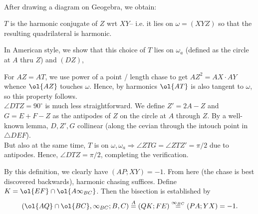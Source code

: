 \documentclass{seto}
\begin{document}
\\[4pt]
After drawing a diagram on Geogebra, we obtain:
\begin{block}[Characterization of T]
$T$ is the harmonic conjugate of $Z$ wrt $XY$-- i.e. it lies on $\omega=(XYZ)$ so that the resulting quadrilateral is harmonic.
\end{block}
In American style, we show that this choice of $T$ lies on $\omega_a$ (defined as the circle at $A$ thru $Z$) and $(DZ)$, 
\begin{block}
For $AZ=AT$, we use power of a point / length chase to get $AZ^2=AX\cdot AY$
whence $\ol{AZ}$ touches $\omega$. Hence, by harmonics $\ol{AT}$ is
also tangent to $\omega$, so this property follows. \\[4pt]
$\angle DTZ=90^\circ$ is much less straightforward.
We define $Z'=2A-Z$ and $G=E+F-Z$ as the antipodes of $Z$ on the circle at $A$
through $Z$. By a well-known lemma, $D,Z',G$ collinear (along the cevian through
the intouch point in $\triangle DEF$).
\\[4pt]
But also at the same time, $T$ is on $\omega,\omega_a\Rightarrow \angle
ZTG=\angle ZTZ'=\pi/2$ due to antipodes. Hence, $\angle DTZ=\pi/2$, completing
the verification.
\end{block}
By this definition, we clearly have $(AP;XY)=-1$. 
From here (the chase is best discovered backwards), harmonic chasing suffices. Define $K=\ol{EF}\cap\ol{A\infty_{BC}}$. 
Then the bisection is established by
\[(\ol{AQ}\cap\ol{BC}, \infty_{BC};B,C) \overset A=(QK;FE)\overset{\infty_{BC}}=(PA;YX)=-1.\]
\end{document}
